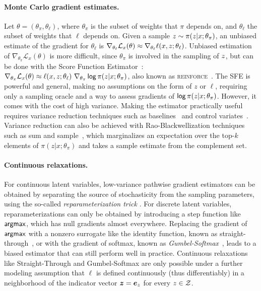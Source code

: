 \paragraph*{Monte Carlo gradient estimates.} Let $\theta=(\theta_\pi,
    \theta_\ell)$, where $\theta_\pi$ is the subset of weights that $\pi$
depends on, and $\theta_\ell$ the subset of weights that $\ell$
depends on. Given a sample $z \sim \pi(z| x;\theta_\pi)$, an
unbiased estimate of the gradient for  \wrt
$\theta_\ell$ is $\nabla_{\theta_\ell} \mathcal L_x(\theta) \approx
    \nabla_{\theta_\ell} \ell(x, z; \theta_\ell)$. Unbiased
estimation of $\nabla_{\theta_\pi} \mathcal L_x(\theta)$ is more
difficult, since $\theta_\pi$ is involved in the sampling of
$z$, but can be done with the Score Function
Estimator~\citep[SFE;][]{rubinstein1976monte,paisley2012variational}:
$\nabla_{\theta_\pi} \mathcal L_x(\theta) \approx \ell(x, z;
    \theta_\ell) ~ \nabla_{\theta_\pi} \operatorname*{\mathsf{log}} \pi(z | x; \theta_\pi)$,
also known as \textsc{reinforce}~\citep{Williams1992}. The SFE is
powerful and general, making no assumptions on the form of $z$ or
$\ell$, requiring only a sampling oracle and a way to assess
gradients of $\operatorname*{\mathsf{log}} \pi(z | x; \theta_\pi)$. However, it comes
with the cost of high variance. Making the estimator practically
useful requires variance reduction techniques such as
baselines~\citep{Williams1992,MuProp} and control
variates~\citep{CV2013,REBAR,RELAX}. Variance reduction can also be
achieved with Rao-Blackwellization techniques such as sum and
sample~\citep{casella1996rao,BBVI14,RB19}, which marginalizes an
expectation over the top-$k$ elements of $\pi(z| x;\theta_\pi)$ and
takes a sample estimate from the complement set.

\paragraph*{Continuous relaxations.} For continuous latent variables,
low-variance pathwise gradient estimators can be obtained by
separating the source of stochasticity from the sampling parameters,
using the so-called \emph{reparameterization trick}
\citep{Kingma+2014:VAE,RezendeEtAl14VAE}. For discrete latent
variables, reparameterizations can only be obtained by introducing a
step function like $\operatorname*{\mathsf{argmax}}$, which has null gradients almost everywhere.
Replacing the gradient of $\operatorname*{\mathsf{argmax}}$ with a nonzero surrogate like the identity
function, known as straight-through~\citep{STE}, or with the gradient of softmax, known
as \emph{Gumbel-Softmax}~\citep{Concrete,GumbelSoftmax}, leads to a
biased estimator that can still perform well in practice. Continuous
relaxations like Straight-Through and Gumbel-Softmax are only
possible under a further modeling assumption that $\ell$ is defined
continuously (thus differentiably) in a neighborhood of the
indicator vector $\bm{z} = \bm{e}_{z}$ for every $z \in \mathcal{Z}$.

